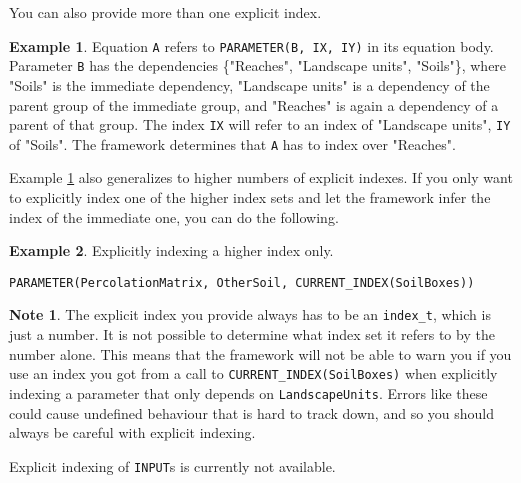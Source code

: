 \documentclass[11pt]{article}
\theoremstyle{definition}
\newtheorem{mynote}{Note}
\newenvironment{note}%
  {\begin{lrbox}{\notebox}%
   \begin{minipage}{\dimexpr\linewidth-2\fboxsep}
   \begin{mynote}}%
  {\end{mynote}%
   \end{minipage}%
   \end{lrbox}%
   \begin{trivlist}
     \item[]\colorbox{silver}{\usebox\notebox}
   \end{trivlist}}
\newtheorem{myexample}{Example}
\newenvironment{example}%
  {\begin{lrbox}{\examplebox}%
   \begin{minipage}{\dimexpr\linewidth-2\fboxsep}
   \begin{myexample}}%
  {\end{myexample}%
   \end{minipage}%
   \end{lrbox}%
   \begin{trivlist}
     \item[]\colorbox{silver}{\usebox\examplebox}
   \end{trivlist}}
\begin{document}
You can also provide more than one explicit index.

\begin{example}\label{ex:multipleexplicitindexes}
Equation {\tt A} refers to {\tt PARAMETER(B, IX, IY)} in its equation body. Parameter {\tt B} has the dependencies \{"Reaches", "Landscape units", "Soils"\}, where "Soils" is the immediate dependency, "Landscape units" is a dependency of the parent group of the immediate group, and "Reaches" is again a dependency of a parent of that group. The index {\tt IX} will refer to an index of "Landscape units", {\tt IY} of "Soils". The framework determines that {\tt A} has to index over "Reaches".
\end{example}

Example \ref{ex:multipleexplicitindexes} also generalizes to higher numbers of explicit indexes. If you only want to explicitly index one of the higher index sets and let the framework infer the index of the immediate one, you can do the following.

\begin{example}
Explicitly indexing a higher index only.
\begin{lstlisting}[style=mycpp]
PARAMETER(PercolationMatrix, OtherSoil, CURRENT_INDEX(SoilBoxes))
\end{lstlisting}
\end{example}

\begin{note}
The explicit index you provide always has to be an {\tt index\_t}, which is just a number. It is not possible to determine what index set it refers to by the number alone. This means that the framework will not be able to warn you if you use an index you got from a call to {\tt CURRENT\_INDEX(SoilBoxes)} when explicitly indexing a parameter that only depends on {\tt LandscapeUnits}. Errors like these could cause undefined behaviour that is hard to track down, and so you should always be careful with explicit indexing.
\end{note}

Explicit indexing of {\tt INPUT}s is currently not available.
\end{document}

